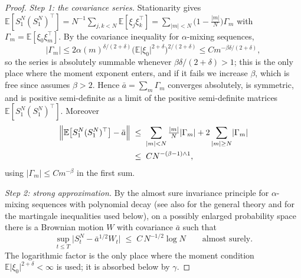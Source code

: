 \documentclass[a4paper,fleqn]{cas-dc}
\theoremstyle{definition}
\newcommand{\E}{\mathbb{E}}
\begin{document}
\begin{proof}
\emph{Step 1: the covariance series.} Stationarity gives
$\E[S^{N}_{1}(S^{N}_{1})^{\top}]
=N^{-1}\sum_{j,k< N}\E[\xi_{j}\xi_{k}^{\top}]
=\sum_{\lvert m\rvert<N}\bigl(1-\tfrac{\lvert m\rvert}{N}\bigr)\Gamma_{m}$ with
$\Gamma_{m}=\E[\xi_{0}\xi_{m}^{\top}]$. By the covariance inequality for $\alpha$-mixing
sequences,
\[
\lvert\Gamma_{m}\rvert\le 2\alpha(m)^{\delta/(2+\delta)}
\bigl(\E\lvert\xi_{0}\rvert^{2+\delta}\bigr)^{2/(2+\delta)}
\le C m^{-\beta\delta/(2+\delta)},
\]
so the series is absolutely summable whenever
$\beta\delta/(2+\delta)>1$; this is the only place where the moment exponent enters,
and if it fails we increase $\beta$, which is free since  assumes
$\beta>2$. Hence $\bar a=\sum_{m}\Gamma_{m}$ converges
absolutely, is symmetric, and is positive semi-definite as a limit of the
positive semi-definite matrices $\E[S^{N}_{1}(S^{N}_{1})^{\top}]$. Moreover
\begin{equation}
\begin{split}
\Bigl\lVert\E\bigl[S^{N}_{1}(S^{N}_{1})^{\top}\bigr]-\bar a\Bigr\rVert
&\;\le\; \sum_{\lvert m\rvert<N}\tfrac{\lvert m\rvert}{N}\lvert\Gamma_{m}\rvert
+2\sum_{\lvert m\rvert\ge N}\lvert\Gamma_{m}\rvert\\
&\;\le\; C N^{-(\beta-1)\wedge 1},
\end{split}
\label{eq:covrate}
\end{equation}
using $\lvert\Gamma_{m}\rvert\le C m^{-\beta}$ in the first sum.

\emph{Step 2: strong approximation.} By the almost sure invariance principle for
$\alpha$-mixing sequences with polynomial decay \citep{philipp1975,berkes1979,wu2005}
(see also \citealp{bradley2005} for the general theory and \citealp{hall1980} for the
martingale inequalities used below), on a possibly enlarged probability space there
is a Brownian motion $W$ with covariance $\bar a$ such that
\begin{equation}
\sup_{t\le T}\bigl\lvert S^{N}_{t}-\bar a^{1/2}W_{t}\bigr\rvert
\;\le\; C\,N^{-1/2}\log N\qquad\text{almost surely.}
\label{eq:saip}
\end{equation}
The logarithmic factor is the only place where the moment condition
$\E\lvert\xi_{0}\rvert^{2+\delta}<\infty$ is used; it is absorbed below by $\gamma$.


\end{proof}
\end{document}
